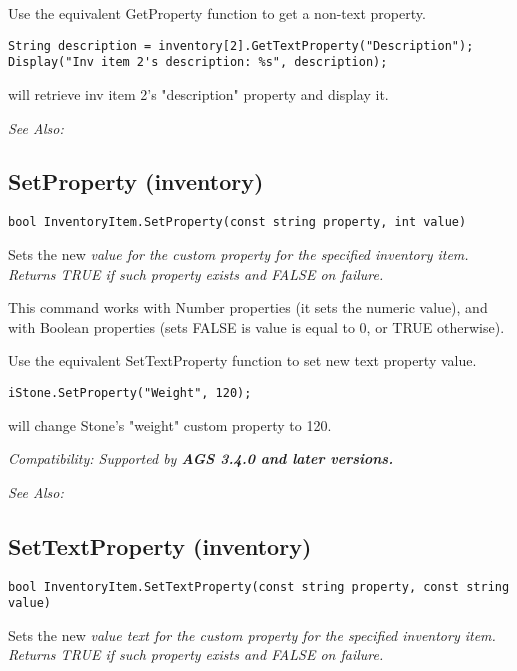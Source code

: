 Use the equivalent GetProperty function to get a non-text property.

\begin{verbatim}
String description = inventory[2].GetTextProperty("Description");
Display("Inv item 2's description: %s", description);
\end{verbatim}
will retrieve inv item 2's "description" property and display it.

\it{See Also:} 


\subsection{SetProperty (inventory)}\label{InventoryItem.SetProperty}%

\begin{verbatim}
bool InventoryItem.SetProperty(const string property, int value)
\end{verbatim}
Sets the new \it{value} for the custom \it{property} for the specified inventory item. Returns
TRUE if such property exists and FALSE on failure.

This command works with Number properties (it sets the numeric value), and with Boolean
properties (sets FALSE is value is equal to 0, or TRUE otherwise).

Use the equivalent SetTextProperty function to set new text property value.

\begin{verbatim}
iStone.SetProperty("Weight", 120);
\end{verbatim}
will change Stone's "weight" custom property to 120.

\it{Compatibility:} Supported by \bf{AGS 3.4.0} and later versions.

\it{See Also:} 


\subsection{SetTextProperty (inventory)}\label{InventoryItem.SetTextProperty}%

\begin{verbatim}
bool InventoryItem.SetTextProperty(const string property, const string value)
\end{verbatim}
Sets the new \it{value} text for the custom \it{property} for the specified inventory item. Returns
TRUE if such property exists and FALSE on failure.

